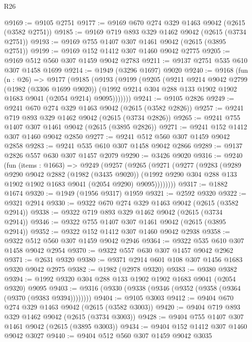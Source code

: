 \begin{lexlean}{R26}
\begin{coremodule}
@9169 := @9105 @2751
@9177 := @9169 @670 @274 @329 @1463 @9042 (@2615 (@3582 @2751))
@9185 := @9169 @719 @893 @329 @1462 @9042 (@2615 (@3734 @2751))
@9193 := @9169 @755 @1407 @307 @1461 @9042 (@2615 (@3895 @2751))
@9199 := @9169 @152 @1412 @307 @1460 @9042 @2775
@9205 := @9169 @512 @560 @307 @1459 @9042 @2783
@9211 := @9137 @2751 @535 @610 @307 @1458 @1699
@9214 := @1949 (@3296 @1697) @9020
@9240 := @9168
    (fun (n : @26) =>
    @9177
      (@9185
        (@9193
          (@9199
            (@9205
              (@9211
                @9214
                @9042
                @2799
                (@1982 (@3306 @1699 @9020))
                (@1992 @9214 @304 @288 @133 @1902 @1902 @1683 @9041 (@2054 @9214) @9095)))))))
@9241 := @9105 @2826
@9249 := @9241 @670 @274 @329 @1463 @9042 (@2615 (@3582 @2826))
@9257 := @9241 @719 @893 @329 @1462 @9042 (@2615 (@3734 @2826))
@9265 := @9241 @755 @1407 @307 @1461 @9042 (@2615 (@3895 @2826))
@9271 := @9241 @152 @1412 @307 @1460 @9042 @2850
@9277 := @9241 @512 @560 @307 @1459 @9042 @2858
@9283 := @9241 @535 @610 @307 @1458 @9042 @2866
@9289 := @9137 @2826 @557 @630 @307 @1457 @2079
@9290 := @3426 @9020
@9316 := @9240
    (fun (items : @1663) =>
    @9249
      (@9257
        (@9265
          (@9271
            (@9277
              (@9283
                (@9289
                  @9290
                  @9042
                  @2882
                  (@1982 (@3435 @9020))
                  (@1992 @9290 @304 @288 @133 @1902 @1902 @1683 @9041 (@2054 @9290) @9095))))))))
@9317 := @1882 @1674
@9320 := @1949 (@1956 @9317) @1959
@9321 := @2592 @9320
@9322 := @9321 @2914
@9330 := @9322 @670 @274 @329 @1463 @9042 (@2615 (@3582 @2914))
@9338 := @9322 @719 @893 @329 @1462 @9042 (@2615 (@3734 @2914))
@9346 := @9322 @755 @1407 @307 @1461 @9042 (@2615 (@3895 @2914))
@9352 := @9322 @152 @1412 @307 @1460 @9042 @2938
@9358 := @9322 @512 @560 @307 @1459 @9042 @2946
@9364 := @9322 @535 @610 @307 @1458 @9042 @2954
@9370 := @9322 @557 @630 @307 @1457 @9042 @2962
@9371 := @2631 @9320
@9380 := @9371 @2914 @601 @108 @307 @1456 @1683 @9320 @9042 @2975
@9382 := @1982 (@2978 @9320)
@9383 := @9380 @9382
@9394 := @1992 @9320 @304 @288 @133 @1902 @1902 @1683 @9041 (@2054 @9320) @9095
@9403 := @9316 (@9330 (@9338 (@9346 (@9352 (@9358 (@9364 (@9370 (@9383 @9394))))))))
@9404 := @9105 @3003
@9412 := @9404 @670 @274 @329 @1463 @9042 (@2615 (@3582 @3003))
@9420 := @9404 @719 @893 @329 @1462 @9042 (@2615 (@3734 @3003))
@9428 := @9404 @755 @1407 @307 @1461 @9042 (@2615 (@3895 @3003))
@9434 := @9404 @152 @1412 @307 @1460 @9042 @3027
@9440 := @9404 @512 @560 @307 @1459 @9042 @3035

\end{coremodule}
\end{lexlean}
